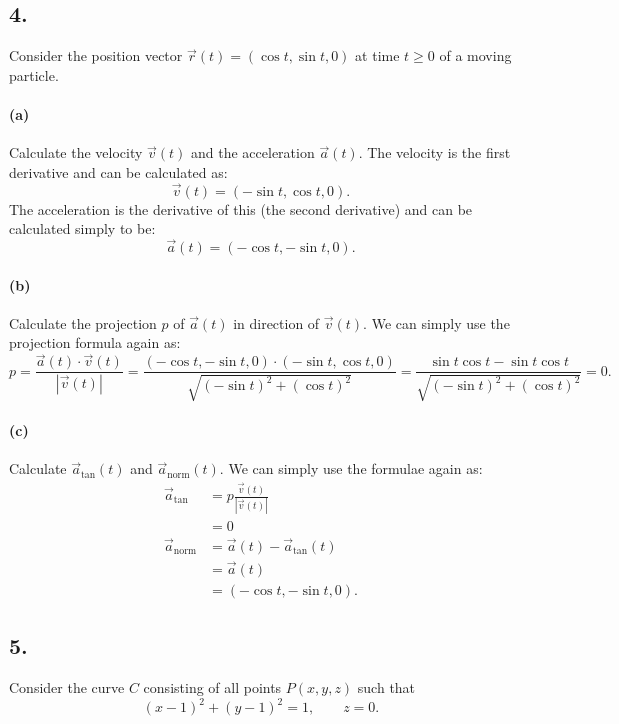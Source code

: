 \subsection*{4.} Consider the position vector $\Vec{r}(t) = \left( \cos t, \sin t, 0 \right) $ at time $t \geq 0$ of a moving particle.

\paragraph{(a)} Calculate the velocity $\Vec{v}(t)$ and the acceleration $\Vec{a}(t)$.
\bigbreak
The velocity is the first derivative and can be calculated as:
\[ 
\Vec{v}(t) = \left( -\sin t, \cos t, 0 \right)
.\]
The acceleration is the derivative of this (the second derivative) and can be calculated simply to be:
\[ 
\Vec{a}(t) = \left( -\cos t, -\sin t, 0 \right) 
.\]



\paragraph{(b)} Calculate the projection $p$ of $\Vec{a}(t)$ in direction of $\Vec{v}(t)$.
\bigbreak
We can simply use the projection formula again as:
\[ 
p = \frac{\Vec{a}(t) \cdot \Vec{v}(t)}{\left| \Vec{v}(t) \right|} = \frac{\left( -\cos t, -\sin t,0 \right) \cdot \left( -\sin t, \cos t,0 \right) }{\sqrt{\left( -\sin t \right)^2 + \left( \cos t \right)^2}} = \frac{\sin t \cos t - \sin t \cos t}{\sqrt{\left( - \sin t \right)^2 + \left( \cos t \right)^2}} = 0
.\]


\paragraph{(c)} Calculate $\Vec{a}_{\mathrm{tan}}(t)$ and $\Vec{a}_{\mathrm{norm}}(t)$.
\bigbreak
We can simply use the formulae again as:
\begin{align*}
  \Vec{a}_{\mathrm{tan}} &= p \frac{\Vec{v}(t)}{\left| \Vec{v}(t) \right|} \\
  &= 0 \\
  \Vec{a}_{\mathrm{norm}} &= \Vec{a}\left( t \right) - \Vec{a}_{\mathrm{tan}}(t) \\
  &= \Vec{a}(t) \\
  &= \left( -\cos t, - \sin t, 0 \right) 
.\end{align*}


\subsection*{5.} Consider the curve $C$ consisting of all points $P(x,y,z)$ such that
\[ 
  (x-1)^2 + (y-1)^2 = 1, \qquad z = 0
.\]

